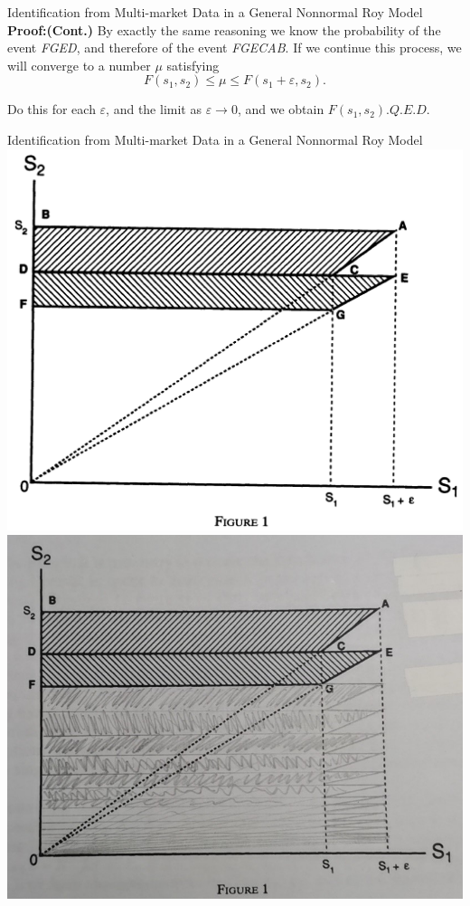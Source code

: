 \documentclass{beamer}
\begin{document}
\begin{frame}{Identification from Multi-market Data in a General Nonnormal Roy Model}
\textbf{Proof:(Cont.)}
By exactly the same reasoning we know the probability of the event \emph{FGED}, and therefore of the event \emph{FGECAB}. If we continue this process, we will converge to a number $\mu$ satisfying
$$F(s_1,s_2)\leq \mu \leq F(s_1+\varepsilon,s_2).$$

Do this for each $\varepsilon$, and the limit as $\varepsilon\to 0$, and we obtain $F(s_1,s_2)$.\hfill $Q.E.D.$
\end{frame}

\begin{frame}{Identification from Multi-market Data in a General Nonnormal Roy Model}
\includegraphics[scale=0.2]{figure1}
\pause
\includegraphics[scale=0.6]{figure2}
\end{frame}
\end{document}
